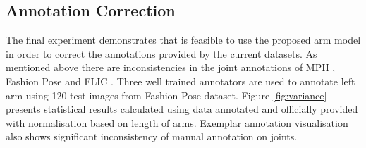 
\subsection{Annotation Correction}
\label{exp:qualitative}

The final experiment demonstrates that is feasible to use the proposed arm model in order to correct the annotations provided by the current datasets. As mentioned above there are inconsistencies in the joint annotations of MPII \cite{andriluka14cvpr}, Fashion Pose \cite{dantone2013human} and FLIC \cite{sapp2013modec}. Three well trained annotators are used to annotate left arm using 120 test images from Fashion Pose \cite{dantone2013human} dataset. Figure \ref{fig:variance} presents statistical results calculated using data annotated and officially provided with normalisation based on length of arms. Exemplar annotation visualisation also shows significant inconsistency of manual annotation on joints.

